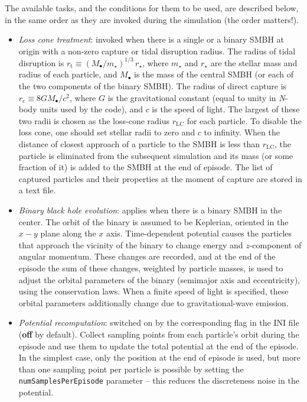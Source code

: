 \documentclass[12pt]{article}
\newcommand{\Nbody}{\textsl{N}-body\xspace}
\begin{document}
The available tasks, and the conditions for them to be used, are described below, in the same order as they are invoked during the simulation (the order matters!).
\begin{itemize}
\item \textsl{Loss cone treatment}: invoked when there is a single or a binary SMBH at origin with a non-zero capture or tidal disruption radius. The radius of tidal disruption is $r_\mathrm{t} \equiv (M_\bullet/m_\star)^{1/3}\,r_\star$, where $m_\star$ and $r_\star$ are the stellar mass and radius of each particle, and $M_\bullet$ is the mass of the central SMBH (or each of the two components of the binary SMBH). The radius of direct capture is $r_\mathrm{c} \equiv 8 G M_\bullet / c^2$, where $G$ is the gravitational constant (equal to unity in \Nbody units used by the code), and $c$ is the speed of light. The largest of these two radii is chosen as the loss-cone radius $r_\mathrm{LC}$ for each particle. To disable the loss cone, one should set stellar radii to zero and $c$ to infinity.
When the distance of closest approach of a particle to the SMBH is less than $r_\mathrm{LC}$, the particle is eliminated from the subsequent simulation and its mass (or some fraction of it) is added to the SMBH at the end of episode. The list of captured particles and their properties at the moment of capture are stored in a text file.
\item \textsl{Binary black hole evolution}: applies when there is a binary SMBH in the center. The orbit of the binary is assumed to be Keplerian, oriented in the $x-y$ plane along the $x$ axis. Time-dependent potential causes the particles that approach the vicinity of the binary to change energy and $z$-component of angular momentum. These changes are recorded, and at the end of the episode the sum of these changes, weighted by particle masses, is used to adjust the orbital parameters of the binary (semimajor axis and eccentricity), using the conservation laws. When a finite speed of light is specified, these orbital parameters additionally change due to gravitational-wave emission.
\item \textsl{Potential recomputation}: switched on by the corresponding flag in the INI file (\textbf{off} by default). Collect sampling points from each particle's orbit during the episode and use them to update the total potential at the end of the episode. In the simplest case, only the position at the end of episode is used, but more than one sampling point per particle is possible by setting the \texttt{numSamplesPerEpisode} parameter -- this reduces the discreteness noise in the potential. 

\end{itemize}
\end{document}
